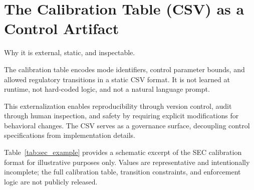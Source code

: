 \documentclass[12pt,a4paper]{article}
\begin{document}
\section{The Calibration Table (CSV) as a Control Artifact}

Why it is external, static, and inspectable.

The calibration table encodes mode identifiers, control parameter bounds, and allowed regulatory transitions in a static CSV format. It is not learned at runtime, not hard-coded logic, and not a natural language prompt.

This externalization enables reproducibility through version control, audit through human inspection, and safety by requiring explicit modifications for behavioral changes. The CSV serves as a governance surface, decoupling control specifications from implementation details.

Table~\ref{tab:sec_example} provides a schematic excerpt of the SEC calibration format for illustrative purposes only. Values are representative and intentionally incomplete; the full calibration table, transition constraints, and enforcement logic are not publicly released.

\begin{table}[H]
\centering
\footnotesize
{} %
\caption{Schematic excerpt of the SEC calibration table format. Each row specifies a calibrated 
regulatory posture rather than an emotional state. Emoji tokens are referenced by their Unicode 
code points (e.g., U+1F6D1), providing compact, human-legible identifiers for these postures, 
while numeric fields define bounded control targets and gating flags. The table is static and 
externally versioned; it does not encode learning, optimization, or transition logic. Multiple 
emoji tokens may map to similar regulatory anchors, enabling semantic redundancy without 
expanding the control space.}
\label{tab:sec_example}
\end{table}
\end{document}
